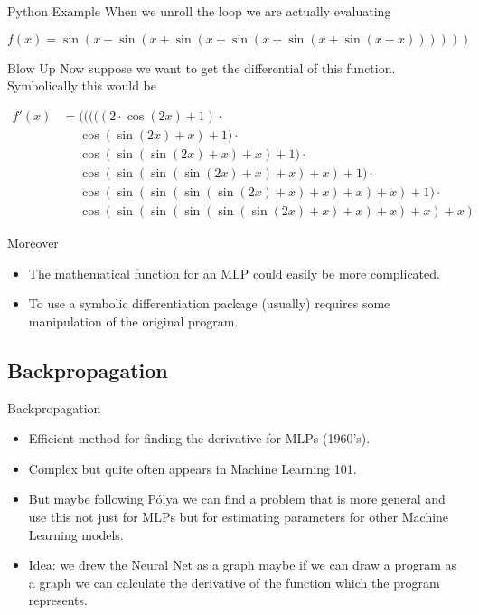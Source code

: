 \documentclass{beamer}
\begin{document}
\begin{frame}[fragile]{Python Example}
When we unroll the loop we are actually evaluating

$$
f(x) = \sin(x + \sin(x + \sin(x + \sin(x + \sin(x + \sin(x + x))))))
$$

\end{frame}

\begin{frame}[fragile]{Blow Up}
Now suppose we want to get the differential of this
function. Symbolically this would be

$$
\begin{aligned}
f'(x) &=           (((((2\cdot \cos(2x)+1)\cdot \\
      &\phantom{=} \cos(\sin(2x)+x)+1)\cdot \\
      &\phantom{=} \cos(\sin(\sin(2x)+x)+x)+1)\cdot \\
      &\phantom{=} \cos(\sin(\sin(\sin(2x)+x)+x)+x)+1)\cdot \\
      &\phantom{=} \cos(\sin(\sin(\sin(\sin(2x)+x)+x)+x)+x)+1)\cdot \\
      &\phantom{=} \cos(\sin(\sin(\sin(\sin(\sin(2x)+x)+x)+x)+x)+x)
\end{aligned}
$$
\end{frame}

\begin{frame}[fragile]{Moreover}
\begin{itemize}
\item The mathematical function for an MLP could easily be more
  complicated.
\item To use a symbolic differentiation package (usually) requires
  some manipulation of the original program.
\end{itemize}
\end{frame}

\subsection{Backpropagation}

\begin{frame}[fragile]{Backpropagation}
\begin{itemize}
\item Efficient method for finding the derivative for MLPs (1960's).
\item Complex but quite often appears in Machine Learning 101.
\item But maybe following P\'{o}lya we can find a problem that is more
  general and use this not just for MLPs but for estimating parameters
  for other Machine Learning models.
\item Idea: we drew the Neural Net as a graph maybe if we can draw a
  program as a graph we can calculate the derivative of the function
  which the program represents.
\end{itemize}
\end{frame}
\end{document}
